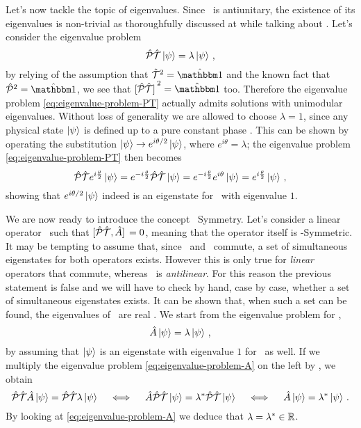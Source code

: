         Let's now tackle the topic of eigenvalues. Since \hPT\ is antiunitary, the existence of its eigenvalues is non-trivial as thoroughfully discussed at  while talking about \hT. Let's consider the eigenvalue problem
        \begin{equation}
            \label{eq:eigenvalue-problem-PT}
            \mathcal{\hat{P}}\mathcal{\hat{T}} \ket{\psi} = \lambda \ket{\psi}
            \,\text{,}
        \end{equation}
        by relying of the assumption that $\hT^2 = \togglehat{\idM}$ and the known fact that $\hP^2 = \togglehat{\idM}$, we see that $\bqty*{\hPT}^2 = \togglehat{\idM}$ too. Therefore the eigenvalue problem \eqref{eq:eigenvalue-problem-PT} actually admits solutions with unimodular eigenvalues. Without loss of generality we are allowed to choose $\lambda = 1$, since any physical state $\ket{\psi}$ is defined up to a pure constant phase \cite{Bender2005}. This can be shown by operating the substitution $\ket{\psi} \rightarrow e^{i\theta / 2}\ket{\psi}$, where $e^{i\theta} = \lambda$; the eigenvalue problem \eqref{eq:eigenvalue-problem-PT} then becomes
        \begin{equation*}
            \mathcal{\hat{P}}\mathcal{\hat{T}} e^{i\frac{\theta}{2}} \ket{\psi} = e^{-i\frac{\theta}{2}} \mathcal{\hat{P}}\mathcal{\hat{T}} \ket{\psi} = e^{-i\frac{\theta}{2}} e^{i\theta} \ket{\psi} = e^{i\frac{\theta}{2}} \ket{\psi}
            \,\text{,}
        \end{equation*}
        showing that $e^{i\theta / 2}\ket{\psi}$ indeed is an eigenstate for \hPT\ with eigenvalue $1$.

        We are now ready to introduce the concept \PT\ Symmetry. Let's consider a linear operator \hA\ such that $\comm*{\hPT}{\hA} = 0$, meaning that the operator itself is \PT-Symmetric. It may be tempting to assume that, since \hA\ and \hPT\ commute, a set of simultaneous eigenstates for both operators exists. However this is only true for \emph{linear} operators that commute, whereas \hPT\ is \emph{antilinear}. For this reason the previous statement is false \cite{bender2024} and we will have to check by hand, case by case, whether a set of simultaneous eigenstates exists. It can be shown that, when such a set can be found, the eigenvalues of \hA\ are real \cite{bender2024}. We start from the eigenvalue problem for \hA,
        \begin{equation}
            \label{eq:eigenvalue-problem-A}
            \hat{A} \ket{\psi} = \lambda \ket{\psi}
            \,\text{,}
        \end{equation}
        by assuming that $\ket{\psi}$ is an eigenstate with eigenvalue $1$ for \hPT\ as well. If we multiply the eigenvalue problem \eqref{eq:eigenvalue-problem-A} on the left by \hPT, we obtain
        \begin{equation*}
            \mathcal{\hat{P}}\mathcal{\hat{T}} \hat{A} \ket{\psi} = \mathcal{\hat{P}}\mathcal{\hat{T}} \lambda \ket{\psi}
            \quad\iff\quad
            \hat{A} \mathcal{\hat{P}}\mathcal{\hat{T}} \ket{\psi} = \lambda^* \mathcal{\hat{P}}\mathcal{\hat{T}} \ket{\psi}
            \quad\iff\quad
            \hat{A} \ket{\psi} = \lambda^* \ket{\psi}
            \,\text{.}
        \end{equation*}
        By looking at \eqref{eq:eigenvalue-problem-A} we deduce that $\lambda = \lambda^* \in \mathbb{R}$.

